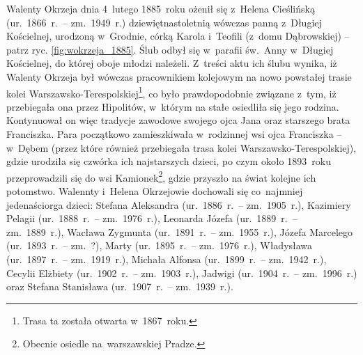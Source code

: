 \begin{figure}[!ht]
\begin{minipage}[t]{0.48\textwidth}
\end{minipage}
\vspace*{0.5cm}
\end{figure}

Walenty Okrzeja dnia 4~lutego 1885~roku ożenił się z~Helena Cieślińską
(ur.~1866~r.~-- zm.~1949~r.) dziewiętnastoletnią wówczas panną z~Długiej
Kościelnej, urodzoną w~Grodnie, córką Karola i~Teofili (z~domu Dąbrowskiej) --
patrz ryc. \ref{fig:wokrzeja_1885}. Ślub odbył się w~parafii św.~Anny
w~Długiej Kościelnej, do której oboje młodzi należeli. Z~treści aktu ich ślubu
wynika, iż Walenty Okrzeja był wówczas pracownikiem kolejowym na nowo
powstałej trasie kolei Warszawsko-Terespolskiej\footnote{Trasa ta została
otwarta w~1867~roku.}, co było prawdopodobnie związane z~tym, iż przebiegała
ona przez Hipolitów, w~którym na stałe osiedliła się jego rodzina. Kontynuował
on więc tradycje zawodowe swojego ojca Jana oraz starszego brata Franciszka.
Para początkowo zamieszkiwała w~rodzinnej wsi ojca Franciszka -- w~Dębem
(przez które również przebiegała trasa kolei Warszawsko-Terespolskiej), gdzie
urodziła się czwórka ich najstarszych dzieci, po czym około 1893~roku
przeprowadzili się do wsi Kamionek\footnote{Obecnie osiedle na~warszawskiej
Pradze.}, gdzie przyszło na świat kolejne ich potomstwo. Walennty i~Helena
Okrzejowie dochowali się co~najmniej jedenaściorga dzieci:
Stefana Aleksandra (ur.~1886~r.~-- zm.~1905~r.), Kazimiery Pelagii
(ur.~1888~r.~-- zm.~1976~r.), Leonarda Józefa (ur.~1889~r.~-- zm.~1889~r.),
Wacława Zygmunta (ur.~1891~r.~-- zm.~1955~r.), Józefa Marcelego
(ur.~1893~r.~-- zm.~?), Marty (ur.~1895~r.~-- zm.~1976~r.), Władysława
(ur.~1897~r.~-- zm.~1919~r.), Michała Alfonsa (ur.~1899~r.~-- zm.~1942~r.),
Cecylii Elżbiety (ur.~1902~r.~-- zm.~1903~r.), Jadwigi (ur.~1904~r.~--
zm.~1996~r.) oraz Stefana Stanisława (ur.~1907~r.~-- zm.~1939~r.).

